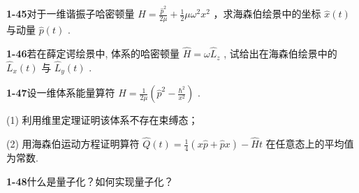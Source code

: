 \newpage
\vfill

\noindent
\textbf{1-45}\quad 对于一维谐振子哈密顿量 $\hat{H} = \frac{\hat{p}^2}{2\mu} + \frac{1}{2}\mu \omega^2 x^2$ ，求海森伯绘景中的坐标 $\hat{x}(t)$ 与动量 $\hat{p}(t)$ .

\vfill

\newpage
\vfill

\noindent
\textbf{1-46}\quad 若在薛定谔绘景中, 体系的哈密顿量 $\hat{H} = \omega \hat{L}_z$ , 试给出在海森伯绘景中的 $\hat{L}_x(t)$ 与 $\hat{L}_y(t)$ .

\vfill

\newpage
\vfill

\noindent
\textbf{1-47}\quad 设一维体系能量算符 $\hat{H} = \frac{1}{2\mu}\left(\hat{p}^2 - \frac{\hbar^2}{x^2}\right)$ . 

(1) 利用维里定理证明该体系不存在束缚态；

(2) 用海森伯运动方程证明算符 $\hat{Q}(t) = \frac{1}{4}(x\hat{p} + \hat{p}x) - \hat{H}t$ 在任意态上的平均值为常数.

\vfill

\newpage
\vfill

\noindent
\textbf{1-48}\quad 什么是量子化？如何实现量子化？

\vfill

\newpage
